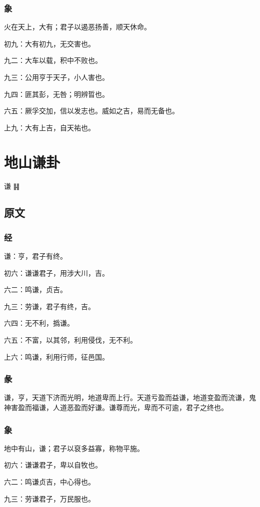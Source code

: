\documentclass[12pt,oneside]{book}
\begin{document}
\subsection{象}
火在天上，大有；君子以遏恶扬善，顺天休命。

初九：大有初九，无交害也。

九二：大车以载，积中不败也。

九三：公用亨于天子，小人害也。

九四：匪其彭，无咎；明辨晢也。

六五：厥孚交加，信以发志也。威如之吉，易而无备也。

上九：大有上吉，自天祐也。


\chapter{地山谦卦}
谦 {\Large ䷎}

\section{原文}

\subsection{经}
谦：亨，君子有终。

初六：谦谦君子，用涉大川，吉。

六二：鸣谦，贞吉。

九三：劳谦，君子有终，吉。

六四：无不利，撝谦。

六五：不富，以其邻，利用侵伐，无不利。

上六：鸣谦，利用行师，征邑国。

\subsection{彖}
谦，亨，天道下济而光明，地道卑而上行。天道亏盈而益谦，地道变盈而流谦，鬼神害盈而福谦，人道恶盈而好谦。谦尊而光，卑而不可逾，君子之终也。

\subsection{象}
地中有山，谦；君子以裒多益寡，称物平施。

初六：谦谦君子，卑以自牧也。

六二：鸣谦贞吉，中心得也。

九三：劳谦君子，万民服也。
\end{document}

